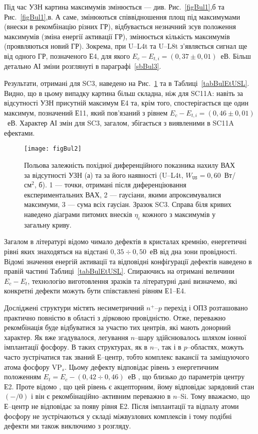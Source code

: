 Під час УЗН картина максимумів змінюється --- див. Рис.~\ref{figBul1},б та Рис.~\ref{figBul1},в.
А саме, змінюються співвідношення площ під максимумами (внески в рекомбінацію різних ГР),
відбувається незначний зсув положення максимумів (зміна енергії активації ГР),
змінюється кількість максимумів (проявляються новий ГР).
Зокрема, при U--L4t та U--L8t з'являється сигнал ще від одного ГР,
позначеного Е4, для якого $E_c-E_{t,i}=(0,37\pm0,01)$~еВ.
Більш детально АІ зміни розглянуті в параграфі~\ref{sbBul3}.


Результати, отримані для SC3, наведено на Рис.~\ref{figBul2} та в Таблиці~\ref{tabBulEtUSL}.
Видно, що в цьому випадку картина більш складна, ніж для SC11A:
навіть за відсутності УЗН присутній максимум Е4 та, крім того,
спостерігається ще один максимум, позначений Е11, який пов'язаний з рівнем $E_c-E_{t,i}=(0,46\pm0,01)$~еВ.
Характер АІ змін для SC3, загалом, збігається з виявленими в SC11A ефектами.




\begin{figure}
\center
\texttt{[image: figBul2]}
\caption{\label{figBul2}
Польова залежність похідної диференційного показника нахилу ВАХ за відсутності УЗН (а)
та за його наявності (U--L4t,  $W_\mathtt{US}=0,60$~Вт/см$^2$, б).
1 --- точки, отримані після диференціювання експериментальних ВАХ,
2 --- гаусіани, якими апроксимувалися максимуми,
3 --- сума всіх гаусіан.
Зразок SC3.
Справа біля кривих наведено діаграми питомих внесків $\eta_i$ кожного з максимумів у загальну криву.
}%
\end{figure}

Загалом в літературі відомо чимало дефектів в кристалах кремнію, енергетичні рівні яких знаходяться на відстані
$0,35\div0,50$~еВ від дна зони провідності.
Відомі значення енергій активації та відповідні конфігурації дефектів наведено в правій частині Таблиці~\ref{tabBulEtUSL}.
Спираючись на отримані величини $E_c-E_t$, технологію виготовлення зразків та літературні дані
визначемо, які конкретні дефекти можуть бути співставлені рівням Е1--Е4.

Досліджені структури містять несиметричний $n^+$--$p$ перехід і ОПЗ розташовано практично повністю в області з дірковою провідністю.
Отже, переважно рекомбінація буде відбуватися за участю тих центрів, які мають донорний характер.
Як вже згадувалося, легування $n$--шару здійснювалось шляхом іонної імплантації фосфору.
В таких структурах, як в $n$--, так і в $p$--областях, можуть часто зустрічатися так званий Е--центр,
тобто комплекс вакансії та заміщуючого атома фосфору VP$_s$.
Цьому дефекту відповідає  рівень з енергетичним положенням $E_t=E_c-(0,42\div0,46)$~еВ \cite{VI:Luc,Karazh,Kuchinskii,Ecentre:2005}, що близько до параметрів центру Е2.
Проте відомо \cite{Kuchinskii,Ecentre:2005}, що цей рівень є акцепторним, йому відповідає зарядовий стан  $(-/0)$ і він є рекомбінаційно--активним переважно в $n$--Si.
Тому вважаємо, що Е--центр не відповідає за появу рівня Е2.
Після імплантації та відпалу атоми фосфору не зустрічаються у складі міжвузлових комплексів \cite{ChelyadFTT} і тому подібні дефекти ми також виключимо з розгляду.

